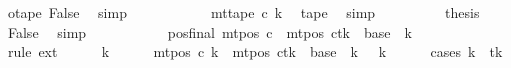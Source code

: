 \begin{isabellebody}
\ otape{}\ False\ \isamarkupfalse%
\ simp\isanewline
\ \ \ \ \ \ \isamarkupfalse%
\ \isamarkupfalse%
\ {\isachardoublequoteopen}{\isasymdots}\ {\isacharequal}{\kern0pt}\ mt{\isacharunderscore}{\kern0pt}tape\ c{\isacharprime}{\kern0pt}\ k{\isacharprime}{\kern0pt}{\isachardoublequoteclose}\ \isamarkupfalse%
\ tape{}\ \isamarkupfalse%
\ simp\isanewline
\ \ \ \ \ \ \isamarkupfalse%
\ \isamarkupfalse%
\ {\isacharquery}{\kern0pt}thesis\ \isamarkupfalse%
\ False\ \isamarkupfalse%
\ simp\isanewline
\ \ \ \ \isamarkupfalse%
\isanewline
\ \ \isamarkupfalse%
\isanewline
\ \ \isamarkupfalse%
\ pos{\isacharunderscore}{\kern0pt}final{\isacharcolon}{\kern0pt}\ {\isachardoublequoteopen}mt{\isacharunderscore}{\kern0pt}pos\ c{}\ {\isacharequal}{\kern0pt}\ {\isacharparenleft}{\kern0pt}mt{\isacharunderscore}{\kern0pt}pos\ c{\isacharprime}{\kern0pt}{\isacharparenright}{\kern0pt}{\isacharparenleft}{\kern0pt}tk\ {\isacharcolon}{\kern0pt}{\isacharequal}{\kern0pt}\ base\ {\isacharplus}{\kern0pt}\ {\isacharparenleft}{\kern0pt}{\isacharquery}{\kern0pt}k\ {\isacharminus}{\kern0pt}\ {}{\isacharparenright}{\kern0pt}{\isacharparenright}{\kern0pt}{\isachardoublequoteclose}\isanewline
\ \ \isamarkupfalse%
\ {\isacharparenleft}{\kern0pt}rule\ ext{\isacharparenright}{\kern0pt}\isanewline
\ \ \ \ \isamarkupfalse%
\ k{\isacharprime}{\kern0pt}\isanewline
\ \ \ \ \isamarkupfalse%
\ {\isachardoublequoteopen}mt{\isacharunderscore}{\kern0pt}pos\ c{}\ k{\isacharprime}{\kern0pt}\ {\isacharequal}{\kern0pt}\ {\isacharparenleft}{\kern0pt}{\isacharparenleft}{\kern0pt}mt{\isacharunderscore}{\kern0pt}pos\ c{\isacharprime}{\kern0pt}{\isacharparenright}{\kern0pt}{\isacharparenleft}{\kern0pt}tk\ {\isacharcolon}{\kern0pt}{\isacharequal}{\kern0pt}\ base\ {\isacharplus}{\kern0pt}\ {\isacharparenleft}{\kern0pt}{\isacharquery}{\kern0pt}k\ {\isacharminus}{\kern0pt}\ {}{\isacharparenright}{\kern0pt}{\isacharparenright}{\kern0pt}{\isacharparenright}{\kern0pt}\ k{\isacharprime}{\kern0pt}{\isachardoublequoteclose}\isanewline
\ \ \ \ \isamarkupfalse%
\ {\isacharparenleft}{\kern0pt}cases\ {\isachardoublequoteopen}k{\isacharprime}{\kern0pt}\ {\isacharequal}{\kern0pt}\ tk{\isachardoublequoteclose}{\isacharparenright}{\kern0pt}\isanewline

\end{isabellebody}
